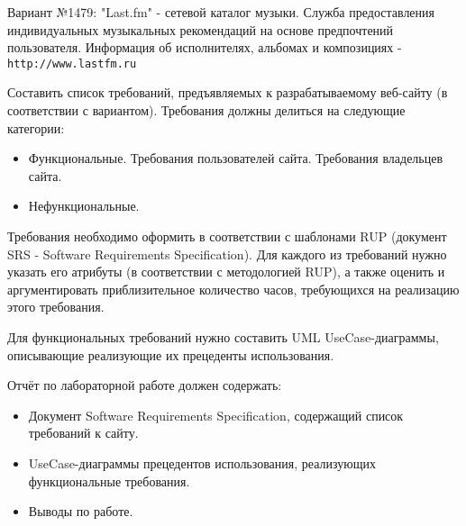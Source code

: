 \newpage

Вариант №1479: "Last.fm" - сетевой каталог музыки.
Служба предоставления индивидуальных музыкальных рекомендаций на основе предпочтений пользователя.
Информация об исполнителях, альбомах и композициях - \texttt{http://www.lastfm.ru}

Составить список требований, предъявляемых к разрабатываемому веб-сайту (в соответствии с вариантом).
Требования должны делиться на следующие категории:
\begin{itemize}
    \item Функциональные.
    \subitem Требования пользователей сайта.
    \subitem Требования владельцев сайта.
    \item Нефункциональные.
\end{itemize}

Требования необходимо оформить в соответствии с шаблонами RUP (документ SRS - Software Requirements Specification).
Для каждого из требований нужно указать его атрибуты (в соответствии с методологией RUP),
а также оценить и аргументировать приблизительное количество часов, требующихся на реализацию этого требования.

Для функциональных требований нужно составить UML UseCase-диаграммы, описывающие реализующие их прецеденты использования.

Отчёт по лабораторной работе должен содержать:
\begin{itemize}
    \item Документ Software Requirements Specification, содержащий список требований к сайту.
    \item UseCase-диаграммы прецедентов использования, реализующих функциональные требования.
    \item Выводы по работе.
\end{itemize}
